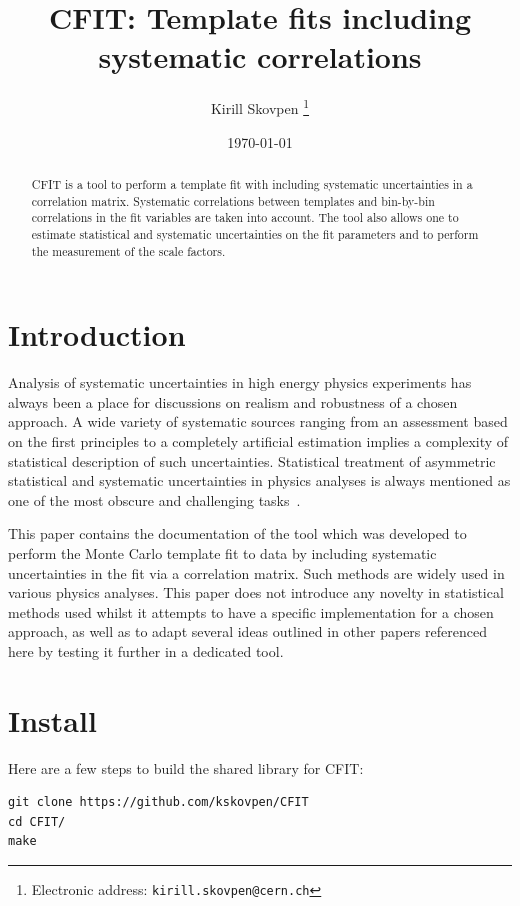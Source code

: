 \documentclass[12pt]{article}
\title{CFIT: Template fits including systematic correlations}
\author{Kirill Skovpen
\thanks{Electronic address: \texttt{kirill.skovpen@cern.ch}}}
\affil{Institut Pluridisciplinaire Hubert Curien, CNRS/IN2P3, Strasbourg, France}
\date{\today}
\begin{document}
\maketitle

\begin{abstract}
CFIT is a tool to perform a template fit with including
systematic uncertainties in a correlation matrix. Systematic
correlations between templates and bin-by-bin correlations in the fit
variables are taken into account. The tool also allows one to estimate
statistical and systematic uncertainties on the fit parameters and to
perform the measurement of the scale factors.
\end{abstract}

\newpage

\tableofcontents

\newpage

\section{Introduction}

Analysis of systematic uncertainties in high energy physics
experiments has always been a place for discussions on realism
and robustness of a chosen approach.
A wide variety of systematic sources ranging from an assessment based on
the first principles to a completely artificial estimation implies a
complexity of statistical description of such uncertainties.
Statistical treatment of asymmetric statistical and systematic
uncertainties in physics analyses is always mentioned as one of the
most obscure and challenging tasks~\cite{BarlowStat,Barlow}.

This paper contains the documentation
of the tool which was developed to perform the Monte Carlo template fit to data by
including systematic uncertainties in the fit via a correlation matrix.
Such methods are widely used in various physics analyses. This
paper does not introduce any novelty in statistical methods used
whilst it attempts to have a specific implementation for a chosen
approach, as well as to adapt several ideas outlined in other papers referenced
here by testing it further in a dedicated tool.

\section{Install}

Here are a few steps to build the shared library for CFIT:

\begin{verbatim}
git clone https://github.com/kskovpen/CFIT
cd CFIT/
make
\end{verbatim}
\end{document}
